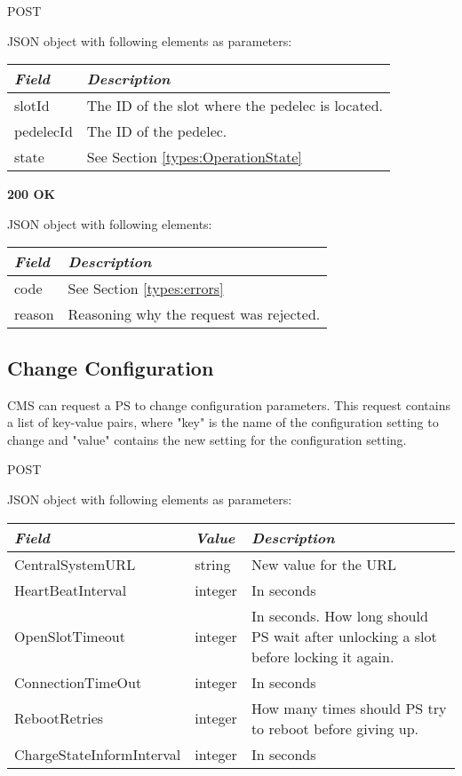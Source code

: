 
 POST

JSON object with following elements as parameters:\\
\begin{tabularx}{\linewidth}{ | l | X | }
  \hline
  \textit{Field} & \textit{Description} \\
  \hline \hline
  slotId			& The ID of the slot where the pedelec is located. \\
  pedelecId		& The ID of the pedelec. \\
  state 			& See Section \ref{types:OperationState} \\
  \hline
\end{tabularx}

 \textbf{200 OK}

JSON object with following elements:\\
\begin{tabularx}{\linewidth}{ | l | X | }
  \hline
  \textit{Field} & \textit{Description} \\
  \hline \hline
  code 			& See Section \ref{types:errors} \\
  reason 		& Reasoning why the request was rejected. \\
  \hline
\end{tabularx}

\subsection{Change Configuration}

\acs{CMS} can request a \acs{PS} to change configuration parameters. This request contains a list of key-value pairs, where "key" is the name of the configuration setting to change and "value" contains the new setting for the configuration setting.


 POST

JSON object with following elements as parameters:\\
\begin{tabularx}{\linewidth}{ | l | l | X | }
  \hline
  \textit{Field} & \textit{Value} &\textit{Description} \\
  \hline \hline
  CentralSystemURL 			& string 		& New value for the URL \\
  HeartBeatInterval 			& integer 		& In seconds \\
  OpenSlotTimeout 			& integer 		& In seconds. How long should \acs{PS} wait after unlocking a slot before locking it again. \\
  ConnectionTimeOut 			& integer 		& In seconds \\
  RebootRetries 				& integer 		& How many times should \acs{PS} try to reboot before giving up.\\
  ChargeStateInformInterval 	& integer 		& In seconds \\
  \hline
\end{tabularx}

